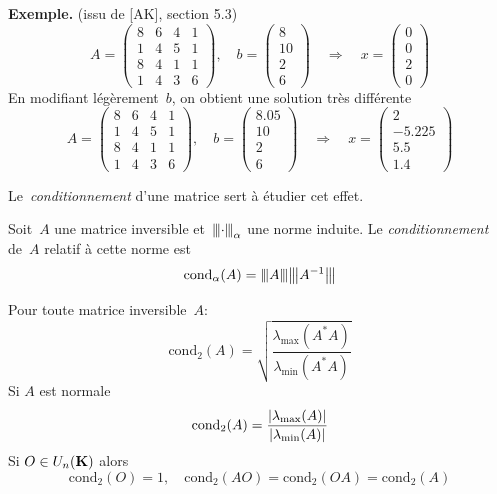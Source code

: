 {\bf Exemple.} (issu de [AK], section 5.3)
\[
A = \left(\begin{array}{cccc}
8 & 6 & 4 & 1 \\
1 & 4 & 5 & 1 \\
8 & 4 & 1 & 1 \\
1 & 4 & 3 & 6
\end{array}\right), \quad b =  \begin{pmatrix}8 \\ 10 \\ 2 \\ 6\end{pmatrix} \quad
\Rightarrow \quad
x = \begin{pmatrix}0 \\ 0 \\ 2 \\ 0\end{pmatrix}
\]
En modifiant légèrement~$b$, on obtient une solution très différente
\[
A = \left(\begin{array}{cccc}
8 & 6 & 4 & 1 \\
1 & 4 & 5 & 1 \\
8 & 4 & 1 & 1 \\
1 & 4 & 3 & 6
\end{array}\right), \quad b = \begin{pmatrix}8.05 \\ 10 \\ 2 \\ 6\end{pmatrix} \quad
\Rightarrow \quad x = \begin{pmatrix}2 \\ -5.225 \\ 5.5 \\ 1.4\end{pmatrix}
\]

Le~\emph{conditionnement} d'une matrice sert à étudier cet effet.

\begin{definition}
	Soit~$A$ une matrice inversible et~${\left\vert\kern-0.25ex\left\vert\kern-0.25ex\left\vert \cdot \right\vert\kern-0.25ex\right\vert\kern-0.25ex\right\vert}_\alpha$ une norme induite.  Le
	\emph{conditionnement} de~$A$ relatif à cette norme est
	\[
		\mathrm{cond}_\alpha(A) = {\left\vert\kern-0.25ex\left\vert\kern-0.25ex\left\vert A \right\vert\kern-0.25ex\right\vert\kern-0.25ex\right\vert}{\left\vert\kern-0.25ex\left\vert\kern-0.25ex\left\vert A^{-1} \right\vert\kern-0.25ex\right\vert\kern-0.25ex\right\vert}
	\]
\end{definition}

\begin{proposition} Pour toute matrice
	inversible~$A$:
\[
\mathrm{cond}_2(A) = \sqrt{\frac{\lambda_{\max}(A^*A)}{\lambda_{\min}(A^*A)}}
\]
Si $A$ est normale
\[
\mathrm{cond}_2(A) = \frac{\left|\lambda_{\max}(A)\right|}{\left|\lambda_{\min}(A)\right|}
\]
Si $O \in U_n(\mathbf{K})$ alors
\[
\mathrm{cond}_2(O) = 1, \quad \mathrm{cond}_2(AO) = \mathrm{cond}_2(OA) = \mathrm{cond}_2(A)
\]
\end{proposition}

